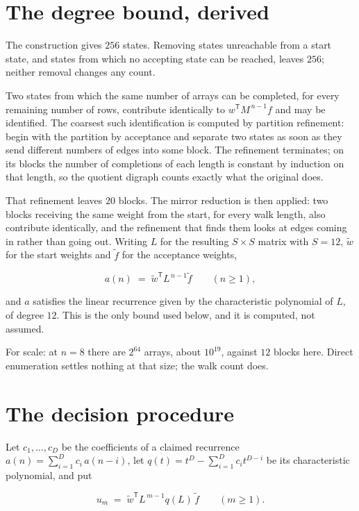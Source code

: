 \documentclass[11pt]{article}
\theoremstyle{definition}
\begin{document}
\section{The degree bound, derived}

The construction gives $256$ states. Removing states unreachable from a start state, and states from which no accepting state can be reached, leaves $256$; neither removal changes any count.

Two states from which the same number of arrays can be completed, for every remaining number of rows, contribute identically to $w^{\mathsf T}M^{\,n-1}f$ and may be identified. The coarsest such identification is computed by partition refinement: begin with the partition by acceptance and separate two states as soon as they send different numbers of edges into some block. The refinement terminates; on its blocks the number of completions of each length is constant by induction on that length, so the quotient digraph counts exactly what the original does.

That refinement leaves $20$ blocks. The mirror reduction is then applied: two blocks receiving the same weight from the start, for every walk length, also contribute identically, and the refinement that finds them looks at edges coming in rather than going out. Writing $L$ for the resulting $S \times S$ matrix with $S = 12$, $\tilde w$ for the start weights and $\tilde f$ for the acceptance weights,

\[a(n) \;=\; \tilde w^{\mathsf T} L^{\,n-1} \tilde f \qquad (n \ge 1),\]

and $a$ satisfies the linear recurrence given by the characteristic polynomial of $L$, of degree $12$. This is the only bound used below, and it is computed, not assumed.

For scale: at $n = 8$ there are $2^{64}$ arrays, about $10^{19}$, against $12$ blocks here. Direct enumeration settles nothing at that size; the walk count does.

\section{The decision procedure}

Let $c_1,\dots,c_D$ be the coefficients of a claimed recurrence $a(n) = \sum_{i=1}^{D} c_i\,a(n-i)$, let $q(t) = t^{D} - \sum_{i=1}^{D} c_i t^{D-i}$ be its characteristic polynomial, and put

\[u_m \;=\; \tilde w^{\mathsf T} L^{\,m-1} q(L)\,\tilde f \qquad (m \ge 1).\]
\end{document}
